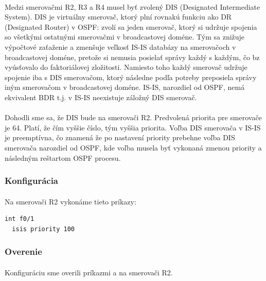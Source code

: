 \documentclass[12pt,twoside,a4paper]{report}
\begin{document}
\paragraph{}
Medzi smerovačmi R2, R3 a R4 musel byť zvolený DIS (Designated Intermediate System). DIS je virtuálny smerovač, ktorý plní rovnakú funkciu ako DR (Designated Router) v OSPF: zvolí sa jeden smerovač, ktorý si udržuje spojenia so všetkými ostatnými smerovačmi v broadcastovej doméne. Tým sa znižuje výpočtové zaťaženie a zmenšuje veľkosť IS-IS databázy na smerovačoch v broadcastovej doméne, pretože si nemusia posielať správy každý s každým, čo bz vyúsťovalo do faktoriálovej zložitosti. Namiesto toho každý smerovač udržuje spojenie iba s DIS smerovačom, ktorý následne podľa potreby preposiela správy iným smerovačom v broadcastovej doméne. IS-IS, narozdiel od OSPF, nemá ekvivalent BDR t.j. v IS-IS neexistuje záložný DIS smerovač.

\paragraph{}
Dohodli sme sa, že DIS bude na smerovači R2. Predvolená priorita pre smerovače je 64. Platí, že čím vyššie číslo, tým vyššia priorita. Voľba DIS smerovača v IS-IS je preemptívna, čo znamená že  po nastavení priority prebehne voľba DIS smerovača narozdiel od OSPF, kde voľba musela byť vykonaná zmenou priority a následným reštartom OSPF procesu.

\subsubsection{Konfigurácia}
\paragraph{}
Na smerovači R2 vykonáme tieto príkazy:
\noindent
{\selectfont
\begin{small}
\begin{verbatim}
int f0/1
  isis priority 100
\end{verbatim}
\end{small}
}

\subsubsection{Overenie}
\paragraph{}
Konfiguráciu sme overili príkazmi  a  na smerovači R2.
\end{document}
